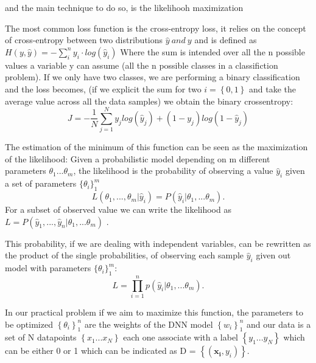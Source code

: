 \documentclass[a4paper,11pt]{article}
\begin{document}
and the main technique to do so, is the likelihooh maximization

The most common loss function is the cross-entropy loss, it relies on the concept of cross-entropy between two distributions $\hat y \ and \ y$ and is defined as
$H(y, \hat y) = -\sum_i^n y_i \cdot log(\hat y_i)$
Where the sum is intended over all the n possible values a variable y can assume (all the n possible classes in a classifiction problem).
If we only have two classes, we are performing a binary classification and the loss becomes, (if we explicit the sum for two $i = \left\{0, 1\right\}$ and take the average value across all the data samples) we obtain the binary crossentropy:
\begin{equation}\label{eq:binary_crossentropy}
J = -\frac{1}{N} \sum_{j= 1}^N y_j log(\hat y_j) + (1-y_j)log(1-\hat y_j)
\end{equation}

The estimation of the minimum of this function can be seen as the maximization of the likelihood:
Given a probabilistic model depending on m different parameters $\theta_1 ... \theta_m$, the likelihood is the probability of observing a value $\hat y_i$ given a set of parameters $\{\theta_i \}_1 ^m$
\begin{equation}
 L(\theta_1, ..., \theta_m | \hat y_i) = P(\hat y_i|\theta_1, ...\theta_m).
\end{equation}
For a subset of observed value we can write the likelihood as $L = P(\hat y_1, ..., \hat y_n | \theta_1, ...\theta_m)$ .

This probability, if we are dealing with independent variables, can be rewritten as the product of the single probabilities, of observing each sample $\hat y_i$ given out model with parameters $\{\theta_i \}_1 ^m$:
\begin{equation}\label{eq:likelihood_product}
L =\prod_{i=1}^n p(\hat y_i|\theta_1, ...\theta_m).
\end{equation}


In our practical problem if we aim to maximize this function, the parameters to be optimized $\left\{\theta_i \right\}_1^n$ are the weights of the DNN model $\left\{w_i \right\}_1^n$ and our data is a set of N datapoints $\left\{ x_1 ... x_N\right\}$ each one associate with a label  $\left\{ y_1 ... y_N\right\}$ which can be either 0 or 1 which can be indicated as D = $\left\{ (\mathbf{x_i}, y_i)\right\}$.
\end{document}
